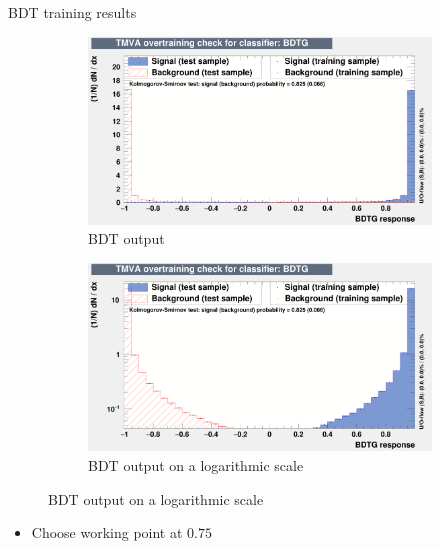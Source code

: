 \documentclass{beamer}
\begin{document}
\begin{frame}{BDT training results}
  \begin{figure}
    \centering
    \vspace{-0.2cm}
    \begin{subfigure}{0.5\textwidth}
      \includegraphics[width = 1.0\textwidth]{Plots/BDToutput.png}
      \caption{BDT output}
    \end{subfigure}%
    \begin{subfigure}{0.5\textwidth}
      \includegraphics[width = 1.0\textwidth]{Plots/BDToutputLog.png}
      \caption{BDT output on a logarithmic scale}
    \end{subfigure}
  \end{figure}
  \begin{itemize}
    \item{Choose working point at $0.75$}
  \end{itemize}
\end{frame}
\end{document}
